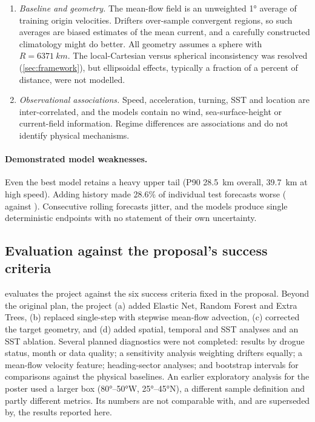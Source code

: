 \begin{enumerate}[label=(\roman*)]
  \item \emph{Baseline and geometry.} The mean-flow field is an unweighted \ang{1} average of training origin velocities. Drifters over-sample convergent regions, so such averages are biased estimates of the mean current, and a carefully constructed climatology \citep[e.g.][]{lumpkin2013} might do better. All geometry assumes a sphere with $R=\SI{6371}{km}$. The local-Cartesian versus spherical inconsistency was resolved (\cref{sec:framework}), but ellipsoidal effects, typically a fraction of a percent of distance, were not modelled.
  \item \emph{Observational associations.} Speed, acceleration, turning, SST and location are inter-correlated, and the models contain no wind, sea-surface-height or current-field information. Regime differences are associations and do not identify physical mechanisms.
\end{enumerate}

\paragraph{Demonstrated model weaknesses.} Even the best model retains a heavy upper tail (P90 \SI{28.5}{km} overall, \SI{39.7}{km} at high speed). Adding history made 28.6\% of individual test forecasts worse (\GBH{} against \GBC). Consecutive rolling forecasts jitter, and the models produce single deterministic endpoints with no statement of their own uncertainty.

\subsection{Evaluation against the proposal's success criteria}
 evaluates the project against the six success criteria fixed in the proposal. Beyond the original plan, the project (a) added Elastic Net, Random Forest and Extra Trees, (b) replaced single-step with stepwise mean-flow advection, (c) corrected the target geometry, and (d) added spatial, temporal and SST analyses and an SST ablation. Several planned diagnostics were not completed: results by drogue status, month or data quality; a sensitivity analysis weighting drifters equally; a mean-flow velocity feature; heading-sector analyses; and bootstrap intervals for comparisons against the physical baselines. An earlier exploratory analysis for the poster used a larger box (\ang{80}--\ang{50}W, \ang{25}--\ang{45}N), a different sample definition and partly different metrics. Its numbers are not comparable with, and are superseded by, the results reported here.

